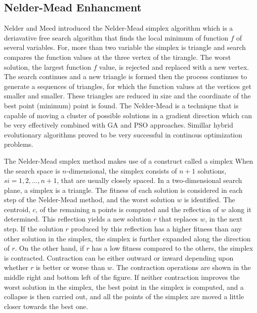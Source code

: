 \documentclass[a4paper,twoside]{article}
\begin{document}
 \subsection{Nelder-Mead Enhancment}

Nelder and Meed introduced the Nelder-Mead simplex algorithm which is a deriavative free  search algorithm that finds the local minimum of  function $f$ of several variables. For, more than two variable the simplex is triangle and search compares  the function values at the three vertex of the tirangle. The worst solution, the largest function $f$ value, is rejected and replaced with a new vertex. The search continues and a new triangle is formed then the process continues to generate a sequences of triangles, for which the function values at the vertices get smaller and smaller. These triangles are reduced in size and the coordinate of the best point (minimum) point is found.  The Nelder-Mead is a technique that is capable of moving a cluster of possible solutions in a gradient direction which can be very effectively combined with GA and PSO approaches. Simillar hybrid evolutionary algorithms proved to be very successful in continous optimization problems. 

  
 



The Nelder-Mead smplex method makes use of a construct called a simplex When the search space is $n$-dimensional, the simplex consists of $n+1$ solutions, $s i = {1,2,\dots  , n+1}$, that are usually closely spaced. In a two-dimensional search plane, a simplex is a triangle. The fitness of each solution is considered in each step of the Nelder-Mead method, and the worst solution $w$ is identified. The centroid, $c$, of the remaining n points is computed and the reflection of $w$ along it determined. This reflection yields a new solution $r$ that replaces $w$, in the next step. If the solution $r$ produced by this reflection has a higher fitness than any other solution in the simplex, the simplex is further expanded along the direction of $r$. On the other hand, if $r$ has a low fitness compared to the others, the simplex is contracted. Contraction can be either outward or inward depending upon whether $r$ is better or worse than $w$. The contraction operations are shown in the middle right and bottom left of the figure. If neither contraction improves the worst solution in the simplex, the best point in the simplex is computed, and a collapse is then carried out, and all the points of the simplex are moved a little closer towards the best one.
\end{document}
